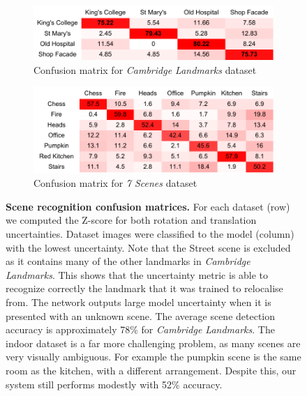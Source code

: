 \begin{figure}[t]
\begin{center}
\begin{subfigure}[b]{0.8\linewidth}
   	\includegraphics[width=\linewidth]{Uncertainty/cambridge_confusion}
   \caption{Confusion matrix for \textit{Cambridge Landmarks} dataset}
\end{subfigure}
\begin{subfigure}[b]{0.8\linewidth}
   	\includegraphics[width=\linewidth]{Uncertainty/confusion_matrix_7scenes}
   \caption{Confusion matrix for \textit{7 Scenes} dataset}
\end{subfigure}
\end{center}
   \caption[Scene recognition confusion matrices]{\textbf{Scene recognition confusion matrices.} For each dataset (row) we computed the Z-score for both rotation and translation uncertainties. Dataset images were classified to the model (column) with the lowest uncertainty. Note that the Street scene is excluded as it contains many of the other landmarks in \textit{Cambridge Landmarks}. This shows that the uncertainty metric is able to recognize correctly the landmark that it was trained to relocalise from. The network outputs large model uncertainty when it is presented with an unknown scene. The average scene detection accuracy is approximately 78\% for \textit{Cambridge Landmarks}. The indoor dataset is a far more challenging problem, as many scenes are very visually ambiguous. For example the pumpkin scene is the same room as the kitchen, with a different arrangement. Despite this, our system still performs modestly with 52\% accuracy.}
\label{fig:confusion_matrix}
\end{figure}

